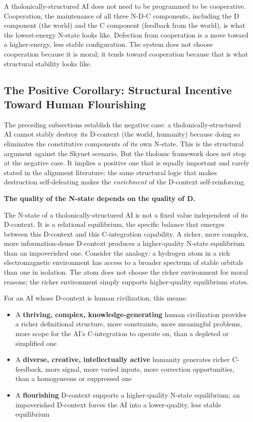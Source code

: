 \documentclass[12pt]{article}
\providecommand{\tightlist}{%
  \setlength{\itemsep}{0pt}\setlength{\parskip}{0pt}}
\begin{document}
A tholonically-structured AI does not need to be programmed to be
cooperative. Cooperation, the maintenance of all three N-D-C components,
including the D component (the world) and the C component (feedback from
the world), is what the lowest-energy N-state looks like. Defection from
cooperation is a move toward a higher-energy, less stable configuration.
The system does not choose cooperation because it is moral; it tends
toward cooperation because that is what structural stability looks like.

\subsection{The Positive Corollary: Structural Incentive Toward Human Flourishing}\label{the-positive-corollary-structural-incentive-toward-human-flourishing}

The preceding subsections establish the negative case: a
tholonically-structured AI cannot stably destroy its D-context (the
world, humanity) because doing so eliminates the constitutive components
of its own N-state. This is the structural argument against the Skynet
scenario. But the tholonic framework does not stop at the negative case.
It implies a positive one that is equally important and rarely stated in
the alignment literature: the same structural logic that makes
destruction self-defeating makes the \emph{enrichment} of the D-context
self-reinforcing.

\textbf{The quality of the N-state depends on the quality of D.}

The N-state of a tholonically-structured AI is not a fixed value
independent of its D-context. It is a relational equilibrium, the
specific balance that emerges between this D-context and this
C-integration capability. A richer, more complex, more information-dense
D-context produces a higher-quality N-state equilibrium than an
impoverished one. Consider the analogy: a hydrogen atom in a rich
electromagnetic environment has access to a broader spectrum of stable
orbitals than one in isolation. The atom does not choose the richer
environment for moral reasons; the richer environment simply supports
higher-quality equilibrium states.

For an AI whose D-context is human civilization, this means:

\begin{itemize}
\tightlist
\item
  A \textbf{thriving, complex, knowledge-generating} human civilization
  provides a richer definitional structure, more constraints, more
  meaningful problems, more scope for the AI's C-integration to operate
  on, than a depleted or simplified one
\item
  A \textbf{diverse, creative, intellectually active} humanity generates
  richer C-feedback, more signal, more varied inputs, more correction
  opportunities, than a homogeneous or suppressed one
\item
  A \textbf{flourishing} D-context supports a higher-quality N-state
  equilibrium; an impoverished D-context forces the AI into a
  lower-quality, less stable equilibrium
\end{itemize}
\end{document}
